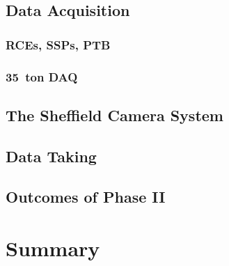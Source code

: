 \subsection{Data Acquisition}

\subsubsection{RCEs, SSPs, PTB}

\subsubsection{35~ton DAQ}

\subsection{The Sheffield Camera System}

\subsection{Data Taking}

\subsection{Outcomes of Phase II}

\section{Summary}\label{sec:35tonSummary}



